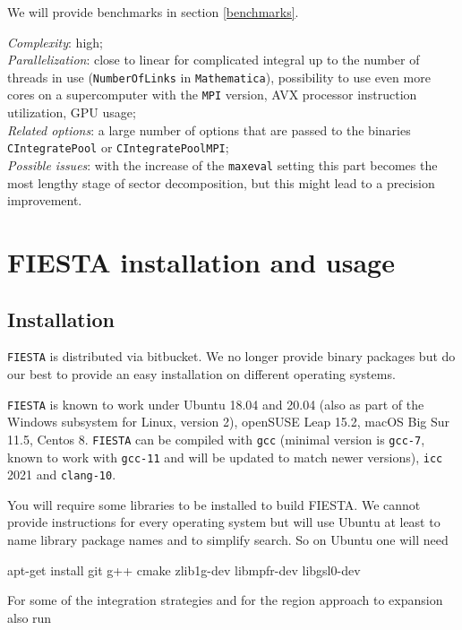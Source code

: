 \documentclass[preprint,12pt]{elsarticle}
\newenvironment{code}
  {\tt\noindent\begin{framed}\begin{flushleft}}
  {\end{flushleft}\end{framed}\normalfont}
\begin{document}
We will provide benchmarks in section \ref{benchmarks}.

\textit{Complexity}: high;\\\indent
\textit{Parallelization}: close to linear for complicated integral up to the number of threads in use ({\tt NumberOfLinks} in {\tt Mathematica}), possibility to use even more cores on a supercomputer with the {\tt MPI} version, AVX processor instruction utilization, GPU usage;\\\indent
\textit{Related options}: a large number of options that are passed to the binaries {\tt CIntegratePool} or {\tt CIntegratePoolMPI};\\\indent
\textit{Possible issues}: with the increase of the {\tt maxeval} setting this part becomes the most lengthy stage of sector decomposition, but this might lead to a precision improvement.

\section{FIESTA installation and usage}
\label{installation}

\subsection{Installation}

{\tt FIESTA} is distributed via bitbucket. We no longer provide binary packages but do our best to provide an easy installation on different operating systems.

{\tt FIESTA} is known to work under Ubuntu 18.04 and 20.04 (also as part of the Windows subsystem for Linux, version 2), openSUSE Leap 15.2, macOS Big Sur 11.5, Centos 8. {\tt FIESTA} can be compiled with {\tt gcc} (minimal version is {\tt gcc-7}, known to work with {\tt gcc-11} and will be updated to match newer versions), {\tt icc} 2021 and {\tt clang-10}.

You will require some libraries to be installed to build FIESTA. We cannot provide instructions for every operating system but will use Ubuntu at least to name library package names and to simplify search. So on Ubuntu one will need

\begin{code} 
apt-get install git g++ cmake zlib1g-dev libmpfr-dev libgsl0-dev 
\end{code}

For some of the integration strategies and for the region approach to expansion also run
\end{document}
